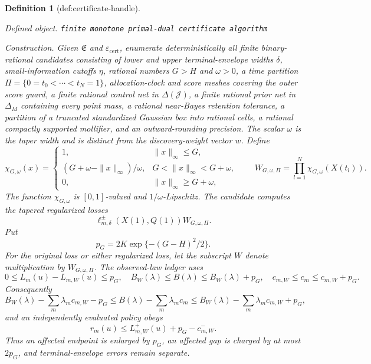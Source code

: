 \documentclass{article}
\newtheorem{definition}{Definition}
\begin{document}
\begin{definition}[def:certificate-handle]\label{def:certificate-handle}
\par\smallskip\noindent\emph{Defined object.} \texttt{finite monotone primal-\allowbreak{}dual certificate algorithm}
\par\smallskip\noindent\emph{Construction.} Given \(\mathfrak E\) and \(\varepsilon_{\mathrm{cert}}\), enumerate deterministically all finite binary-rational candidates consisting of lower and upper terminal-envelope widths \(\delta\), small-information cutoffs \(\eta\), rational numbers \(G>H\) and \(\omega>0\), a time partition \(\Pi=\{0=t_0<\cdots<t_N=1\}\), allocation-clock and score meshes covering the outer score guard, a finite rational control net in \(\Delta(\mathcal J)\), a finite rational prior net in \(\Delta_M\) containing every point mass, a rational near-Bayes retention tolerance, a partition of a truncated standardized Gaussian box into rational cells, a rational compactly supported mollifier, and an outward-rounding precision.  The scalar \(\omega\) is the taper width and is distinct from the discovery-weight vector \(w\).  Define
\[
 \chi_{G,\omega}(x)=
 \begin{cases}
 1,&\|x\|_\infty\leq G,\\
 (G+\omega-\|x\|_\infty)/\omega,&G<\|x\|_\infty<G+\omega,\\
 0,&\|x\|_\infty\geq G+\omega,
 \end{cases}
 \qquad
 W_{G,\omega,\Pi}=\prod_{l=1}^N\chi_{G,\omega}(X(t_l)).
\]
The function \(\chi_{G,\omega}\) is \([0,1]\)-valued and \(1/\omega\)-Lipschitz.  The candidate computes the tapered regularized losses
\[
 \ell_{m,\delta}^{\pm}(X(1),Q(1))W_{G,\omega,\Pi}.
\]
Put
\[
 p_G=2K\exp\{-(G-H)^2/2\}.
\]
For the original loss or either regularized loss, let the subscript \(W\) denote multiplication by \(W_{G,\omega,\Pi}\).  The observed-law ledger uses
\[
 0\leq L_m(u)-L_{m,W}(u)\leq p_G,
 \quad B_W(\lambda)\leq B(\lambda)\leq B_W(\lambda)+p_G,
 \quad c_{m,W}\leq c_m\leq c_{m,W}+p_G.
\]
Consequently
\[
 B_W(\lambda)-\sum_m\lambda_mc_{m,W}-p_G
 \leq B(\lambda)-\sum_m\lambda_mc_m
 \leq B_W(\lambda)-\sum_m\lambda_mc_{m,W}+p_G,
\]
and an independently evaluated policy obeys
\[
 r_m(u)\leq L_{m,W}^{+}(u)+p_G-c_{m,W}^{-}.
\]
Thus an affected endpoint is enlarged by \(p_G\), an affected gap is charged by at most \(2p_G\), and terminal-envelope errors remain separate.


\end{definition}
\end{document}
